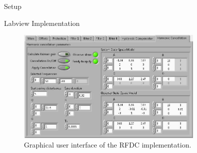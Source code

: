 \documentclass[10pt]{beamer}
\begin{document}
\begin{frame}{Setup}
  \begin{figure}[h]
   \centering %
   \qquad
  \end{figure}
\end{frame}

\begin{frame}{Labview Implementation}
  \begin{figure}[h]
    \centering %
    \includegraphics[width=0.8\textwidth]{../fig/HC_gui}
    \caption{\label{fig:gui}Graphical user interface of the RFDC implementation.}
  \end{figure}
\end{frame}
\end{document}
